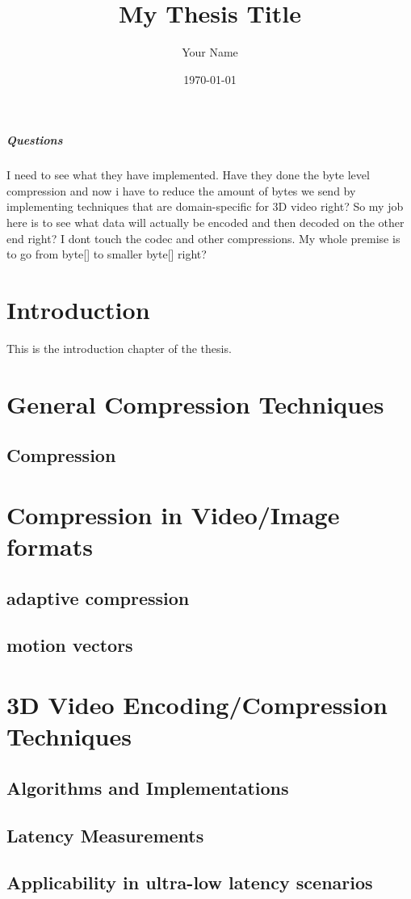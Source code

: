 \documentclass[12pt,a4paper]{report}
\title{My Thesis Title}
\author{Your Name}
\date{\today}
\begin{document}
\maketitle
\paragraph{Questions}

I need to see what they have implemented. Have they done the byte level compression and now i have to reduce the amount of bytes we send by implementing techniques that are domain-specific for 3D video right? So my job here is to see what data will actually be encoded and then decoded on the other end right? I dont touch the codec and other compressions. My whole premise is to go from byte[] to smaller byte[] right?

\cite{Cui_Guo_Li_Jiang_He_Li_2025}

\tableofcontents

\chapter{Introduction}
This is the introduction chapter of the thesis.

\chapter{General Compression Techniques}
\section{Compression}

\chapter{Compression in Video/Image formats}
\section{adaptive compression}
\section{motion vectors}

\chapter{3D Video Encoding/Compression Techniques}
\section{Algorithms and Implementations}
\section{Latency Measurements}
\section{Applicability in ultra-low latency scenarios}
\end{document}
